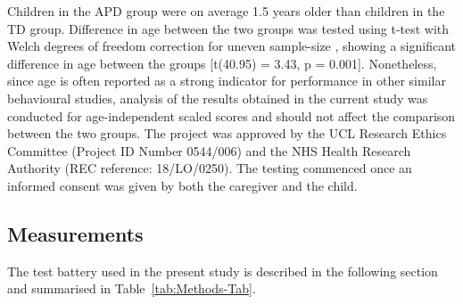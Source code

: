 \documentclass[a4paper, twoside]{templates/ociamthesis}
\begin{document}
Children in the APD group were on average 1.5 years older than children in the TD group. Difference in age between the two groups was tested using t-test with Welch degrees of freedom correction for uneven sample-size \autocite[independent-samples with bootstrapping n=9999; MKinfer package;][]{MKinferPackageR}, showing a significant difference in age between the groups {[}t(40.95) = 3.43, p = 0.001{]}. Nonetheless, since age is often reported as a strong indicator for performance in other similar behavioural studies, analysis of the results obtained in the current study was conducted for age-independent scaled scores and should not affect the comparison between the two groups. The project was approved by the UCL Research Ethics Committee (Project ID Number 0544/006) and the NHS Health Research Authority (REC reference: 18/LO/0250). The testing commenced once an informed consent was given by both the caregiver and the child.

\hypertarget{measurements}{%
\subsection{Measurements}\label{measurements}}

The test battery used in the present study is described in the following section and summarised in Table~\ref{tab:Methods-Tab}.
\end{document}

